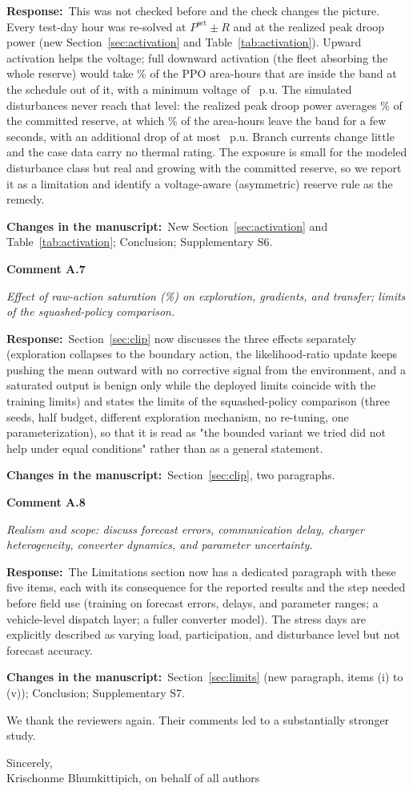 \documentclass[10pt,a4paper]{article}
\newcommand{\rc}[1]{\par\noindent\textbf{Comment #1}\par}
\newcommand{\resp}{\par\noindent\textbf{Response:}\ }
\newcommand{\chg}{\par\noindent\textbf{Changes in the manuscript:}\ }
\begin{document}
\resp This was not checked before and the check changes the picture.
Every test-day hour was re-solved at $P^{\mathrm{set}}\pm R$ and at the
realized peak droop power (new Section~\ref{sec:activation} and
Table~\ref{tab:activation}). Upward activation helps the voltage;
full downward activation (the fleet absorbing the whole reserve)
would take \ActPPONewViolFracDown\% of the PPO area-hours that are
inside the band at the schedule out of it, with a minimum voltage of
\ActPPOVminDown~p.u. The simulated disturbances never reach that
level: the realized peak droop power averages \ActPPOPeakActFracMean\%
of the committed reserve, at which \ActPPONewViolFracDownreal\% of the
area-hours leave the band for a few seconds, with an additional drop
of at most \ActPPODvminDownrealMax~p.u. Branch currents change little
and the case data carry no thermal rating. The exposure is small for
the modeled disturbance class but real and growing with the committed
reserve, so we report it as a limitation and identify a voltage-aware
(asymmetric) reserve rule as the remedy.

\chg New Section~\ref{sec:activation} and Table~\ref{tab:activation};
Conclusion; Supplementary S6.

\rc{A.7} \emph{Effect of raw-action saturation (\ClipDimAll\%) on
exploration, gradients, and transfer; limits of the squashed-policy
comparison.}

\resp Section~\ref{sec:clip} now discusses the three effects
separately (exploration collapses to the boundary action, the
likelihood-ratio update keeps pushing the mean outward with no
corrective signal from the environment, and a saturated output is
benign only while the deployed limits coincide with the training
limits) and states the limits of the squashed-policy comparison
(three seeds, half budget, different exploration mechanism, no
re-tuning, one parameterization), so that it is read as "the bounded
variant we tried did not help under equal conditions" rather than as
a general statement.

\chg Section~\ref{sec:clip}, two paragraphs.

\rc{A.8} \emph{Realism and scope: discuss forecast errors,
communication delay, charger heterogeneity, converter dynamics, and
parameter uncertainty.}

\resp The Limitations section now has a dedicated paragraph with
these five items, each with its consequence for the reported results
and the step needed before field use (training on forecast errors,
delays, and parameter ranges; a vehicle-level dispatch layer; a fuller
converter model). The stress days are explicitly described as varying
load, participation, and disturbance level but not forecast accuracy.

\chg Section~\ref{sec:limits} (new paragraph, items (i) to (v));
Conclusion; Supplementary S7.

We thank the reviewers again. Their comments led to a substantially
stronger study.

Sincerely,\\
Krischonme Bhumkittipich, on behalf of all authors
\end{document}
